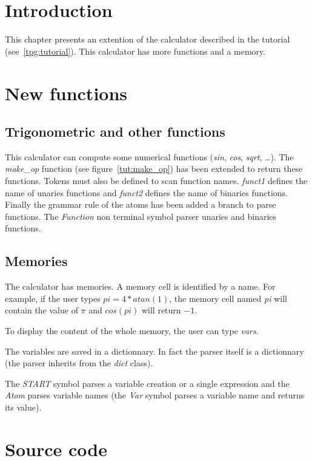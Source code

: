 \section{Introduction}

This chapter presents an extention of the calculator described in the tutorial (see~\ref{tpg:tutorial}).
This calculator has more functions and a memory.

\section{New functions}

\subsection{Trigonometric and other functions}

This calculator can compute some numerical functions (\emph{sin}, \emph{cos}, \emph{sqrt}, \ldots).
The \emph{make\_op} function (see figure~\ref{tut:make_op}) has been extended to return these functions.
Tokens must also be defined to scan function names.
\emph{funct1} defines the name of unaries functions and \emph{funct2} defines the name of binaries functions.
Finally the grammar rule of the atoms has been added a branch to parse functions.
The \emph{Function} non terminal symbol parser unaries and binaries functions.

\subsection{Memories}

The calculator has memories.
A memory cell is identified by a name.
For example, if the user types \emph{$pi = 4*atan(1)$}, the memory cell named \emph{pi} will contain the value of \emph{$\pi$} and \emph{$cos(pi)$} will return \emph{$-1$}.

To display the content of the whole memory, the user can type \emph{vars}.

The variables are saved in a dictionnary.
In fact the parser itself is a dictionnary (the parser inherits from the \emph{dict} class).

The \emph{START} symbol parses a variable creation or a single expression and the \emph{Atom} parses variable names (the \emph{Var} symbol parses a variable name and returns its value).

\section{Source code}

